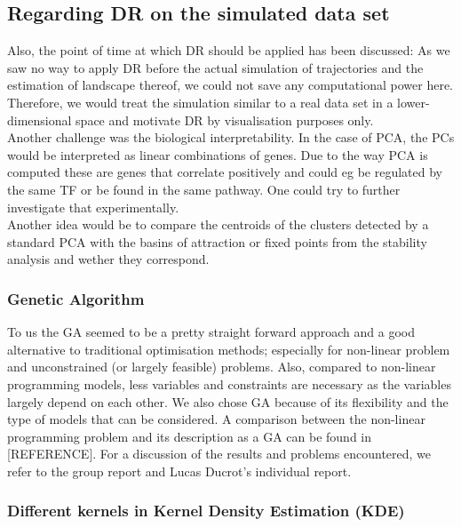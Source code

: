 \documentclass[journal, a4paper]{IEEEtran}
\begin{document}
\subsection{Regarding DR on the simulated data set}

Also, the point of time at which DR should be applied has been discussed: As we saw no way to apply DR before the actual simulation of trajectories and the estimation of landscape thereof, we could not save any computational power here. Therefore, we would treat the simulation similar to a real data set in a lower-dimensional space and motivate DR by visualisation purposes only.\\

Another challenge was the biological interpretability. In the case of PCA, the PCs would be interpreted as linear combinations of genes. Due to the way PCA is computed these are genes that correlate positively and could eg be regulated by the same TF or be found in the same pathway. 
One could try to further investigate that experimentally. \\
Another idea would be to compare the centroids of the clusters detected by a standard PCA with the basins of attraction or fixed points from the stability analysis and wether they correspond.


\subsubsection{Genetic Algorithm}
To us the GA seemed to be a pretty straight forward approach and a good alternative to traditional optimisation methods; especially for non-linear problem and unconstrained (or largely feasible) problems. Also, compared to non-linear programming models, less variables and constraints are necessary as the variables largely depend on each other. We also chose GA because of its flexibility and the type of models that can be considered. A comparison between the non-linear programming problem and its description as a GA can be found in [REFERENCE].%
For a discussion of the results and problems encountered, we refer to the group report and Lucas Ducrot's individual report.


\subsubsection{Different kernels in Kernel Density Estimation (KDE)} 
\end{document}
